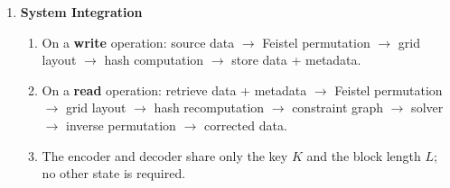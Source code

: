 \begin{enumerate}
    \item \textbf{System Integration}
        \begin{enumerate}
            \item On a \textbf{write} operation: source data $\rightarrow$ Feistel permutation $\rightarrow$ grid layout $\rightarrow$ hash computation $\rightarrow$ store data + metadata.
            \item On a \textbf{read} operation: retrieve data + metadata $\rightarrow$ Feistel permutation $\rightarrow$ grid layout $\rightarrow$ hash recomputation $\rightarrow$ constraint graph $\rightarrow$ solver $\rightarrow$ inverse permutation $\rightarrow$ corrected data.
            \item The encoder and decoder share only the key $K$ and the block length $L$; no other state is required.
        \end{enumerate}

\end{enumerate}
